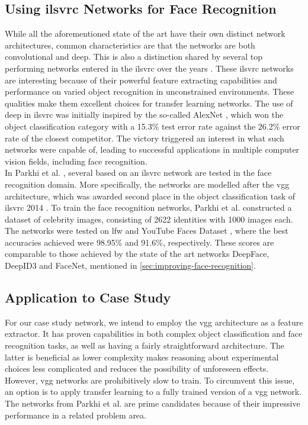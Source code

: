 \subsection{Using \acrshort{ilsvrc} Networks for Face Recognition}

While all the aforementioned state of the art  have their own distinct network architectures, common characteristics are that the networks are both convolutional and deep. This is also a distinction shared by several top performing networks entered in the \acrfull{ilsvrc} \cite{imagenet} over the years \cite{inception, vgg, googlenet}. These \acrshort{ilsvrc} networks are interesting because of their powerful feature extracting capabilities and performance on varied object recognition in unconstrained environments. These qualities make them excellent choices for transfer learning networks. The use of deep  in \acrshort{ilsvrc} was initially inspired by the so-called AlexNet \cite{alexnet}, which won the object classification category with a 15.3\% test error rate against the 26.2\% error rate of the closest competitor. The victory triggered an interest in what such networks were capable of, leading to successful applications in multiple computer vision fields, including face recognition. \\

\noindent In Parkhi et al. \cite{deep-face-rec}, several  based on an \acrshort{ilsvrc} network are tested in the face recognition domain. More specifically, the networks are modelled after the \acrfull{vgg} architecture, which was awarded second place in the object classification task of \acrshort{ilsvrc} 2014 \cite{vgg}. To train the face recognition networks, Parkhi et al. \cite{deep-face-rec} constructed a dataset of celebrity images, consisting of 2622 identities with 1000 images each. The networks were tested on \acrshort{lfw} and YouTube Faces Dataset \cite{youtube-set}, where the best accuracies achieved were 98.95\% and 91.6\%, respectively. These scores are comparable to those achieved by the state of the art networks DeepFace, DeepID3 and FaceNet, mentioned in \autoref{sec:improving-face-recognition}.

\subsection{Application to Case Study} \label{sec:vggface-application}

For our case study network, we intend to employ the \acrshort{vgg} architecture as a feature extractor. It has proven capabilities in both complex object classification and face recognition tasks, as well as having a fairly straightforward architecture. The latter is beneficial as lower complexity makes reasoning about experimental choices less complicated and reduces the possibility of unforeseen effects. However, \acrshort{vgg} networks are prohibitively slow to train. To circumvent this issue, an option is to apply transfer learning to a fully trained version of a \acrshort{vgg} network. The networks from Parkhi et al. \cite{deep-face-rec} are prime candidates because of their impressive performance in a related problem area.

\cleardoublepage